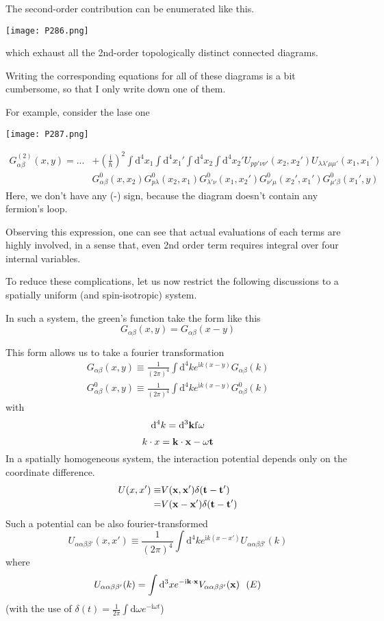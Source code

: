 The second-order contribution can be enumerated like this.
\begin{center}
\texttt{[image: P286.png]}
\end{center}
which exhaust all the 2nd-order topologically distinct connected diagrams.

Writing the corresponding equations for all of these diagrams is a bit cumbersome, so that I only write down one of them.

For example, consider the lase one
\begin{center}
\texttt{[image: P287.png]}
\end{center}
\begin{align}
G^{(2)}_{\alpha\beta}(x,y)=...&+(\frac{\mathrm{i}}{\hbar})^2\int \mathrm{d}^4x_1\int \mathrm{d}^4x_1'\int \mathrm{d}^4x_2\int \mathrm{d}^4x_2'U_{pp'\nu\nu'}(x_2,x_2')U_{\lambda\lambda'\mu\mu'}(x_1,x_1') \nonumber \\
&G_{\alpha\beta}^0(x,x_2)G_{p\lambda}^0(x_2,x_1)G_{\lambda'\nu}^0(x_1,x_2')G_{\nu'\mu}^0(x_2',x_1')G_{\mu'\beta}^0(x_1',y) \nonumber
\end{align}
Here, we don't have any (-) sign, because the diagram doesn't contain any fermion's loop.

Observing this expression, one can see that actual evaluations of each terms are highly involved, in a sense that, even 2nd order term requires integral over four internal variables.

To reduce these complications, let us now restrict the following discussions to a spatially uniform (and spin-isotropic) system.

In such a system, the green's function take the form like this 
$$G_{\alpha\beta}(x,y)=G_{\alpha\beta}(x-y)$$

This form allows us to take a fourier transformation
\begin{align}\label{2.5.5}
G_{\alpha\beta}(x,y)\equiv\frac{1}{(2\pi)^4}\int \mathrm{d}^4ke^{\mathrm{i}k(x-y)}G_{\alpha\beta}(k) \nonumber \\
G^0_{\alpha\beta}(x,y)\equiv\frac{1}{(2\pi)^4}\int \mathrm{d}^4ke^{\mathrm{i}k(x-y)}G^0_{\alpha\beta}(k)
\end{align}
with
$$\mathrm{d}^4k=\mathrm{d}^3\bf{k}\mathrm{f}\omega$$

$$k\cdot x=\bf{k}\cdot\bf{x}-\omega t$$
In a spatially homogeneous system, the interaction potential depends only on the coordinate difference.
\begin{align}\label{2.5.6}
U(x,x')\equiv& V(\bf{x},\bf{x}')\delta(t-t') \nonumber \\
=& V(\bf{x}-\bf{x}')\delta(t-t')
\end{align}
Such a potential can be also fourier-transformed
$$U_{\alpha\alpha\beta\beta'}(x,x')\equiv \frac{1}{(2\pi)^4}\int \mathrm{d}^4ke^{\mathrm{i}k(x-x')}U_{\alpha\alpha\beta\beta'}(k)$$
where
\begin{align}\label{2.5.7}
U_{\alpha\alpha\beta\beta'}(k)=\int \mathrm{d}^3x e^{-\mathrm{i}\bf{k}\cdot\bf{x}}V_{\alpha\alpha\beta\beta'}({\bf x}) \ \ (E)
\end{align}
(with the use of $\delta(t)=\frac{1}{2\pi}\int \mathrm{d}\omega e^{-\mathrm{i}\omega t}$)

